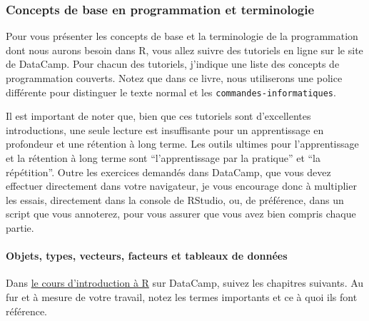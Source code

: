 \documentclass[a4paperpaper,]{article}
\let\oldparagraph\paragraph
\renewcommand{\paragraph}[1]{\oldparagraph{#1}\mbox{}}
\begin{document}
\hypertarget{concepts-de-base-en-programmation-et-terminologie}{%
\subsubsection{Concepts de base en programmation et terminologie}\label{concepts-de-base-en-programmation-et-terminologie}}

Pour vous présenter les concepts de base et la terminologie de la programmation dont nous aurons besoin dans R, vous allez suivre des tutoriels en ligne sur le site de DataCamp. Pour chacun des tutoriels, j'indique une liste des concepts de programmation couverts. Notez que dans ce livre, nous utiliserons une police différente pour distinguer le texte normal et les \texttt{commandes-informatiques}.

Il est important de noter que, bien que ces tutoriels sont d'excellentes introductions, une seule lecture est insuffisante pour un apprentissage en profondeur et une rétention à long terme. Les outils ultimes pour l'apprentissage et la rétention à long terme sont ``l'apprentissage par la pratique'' et ``la répétition''. Outre les exercices demandés dans DataCamp, que vous devez effectuer directement dans votre navigateur, je vous encourage donc à multiplier les essais, directement dans la console de RStudio, ou, de préférence, dans un script que vous annoterez, pour vous assurer que vous avez bien compris chaque partie.

\hypertarget{objects}{%
\paragraph{Objets, types, vecteurs, facteurs et tableaux de données}\label{objects}}

Dans \href{https://www.datacamp.com/community/open-courses/introduction-a-r}{le cours d'introduction à R} sur DataCamp, suivez les chapitres suivants. Au fur et à mesure de votre travail, notez les termes importants et ce à quoi ils font référence.
\end{document}
